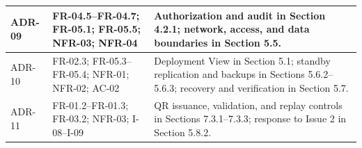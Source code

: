 \begin{longtable}{|>{\raggedright\arraybackslash}p{41.5pt}|>{\raggedright\arraybackslash}p{145.5pt}|>{\raggedright\arraybackslash}p{224.5pt}|}
\hline
ADR-09 & FR-04.5--FR-04.7; FR-05.1; FR-05.5; NFR-03; NFR-04 & Authorization and audit in Section 4.2.1; network, access, and data boundaries in Section 5.5. \\
\hline
ADR-10 & FR-02.3; FR-05.3--FR-05.4; NFR-01; NFR-02; AC-02 & Deployment View in Section 5.1; standby replication and backups in Sections 5.6.2--5.6.3; recovery and verification in Section 5.7. \\*
\hline\noalign{\nobreak}
ADR-11 & FR-01.2--FR-01.3; FR-03.2; NFR-03; I-08--I-09 & QR issuance, validation, and replay controls in Sections 7.3.1--7.3.3; response to Issue 2 in Section 5.8.2. \\
\hline
\end{longtable}
